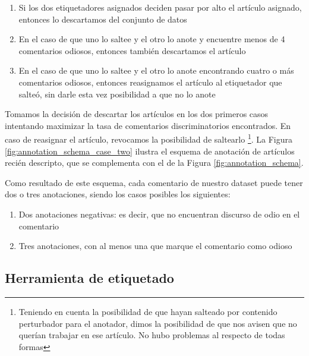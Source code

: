 \begin{enumerate}
    \item Si los dos etiquetadores asignados deciden pasar por alto el artículo asignado, entonces lo descartamos del conjunto de datos
    \item En el caso de que uno lo saltee y el otro lo anote y encuentre menos de 4 comentarios odiosos, entonces también descartamos el artículo
    \item En el caso de que uno lo saltee y el otro lo anote encontrando cuatro o más comentarios odiosos, entonces reasignamos el artículo al etiquetador que salteó, sin darle esta vez posibilidad a que no lo anote
\end{enumerate}

Tomamos la decisión de descartar los artículos en los dos primeros casos intentando maximizar la tasa de comentarios discriminatorios encontrados. En caso de reasignar el artículo, revocamos la posibilidad de saltearlo \footnote{Teniendo en cuenta la posibilidad de que hayan salteado por contenido perturbador para el anotador, dimos la posibilidad de que nos avisen que no querían trabajar en ese artículo. No hubo problemas al respecto de todas formas}. La Figura \ref{fig:annotation_schema_case_two} ilustra el esquema de anotación de artículos recién descripto, que se complementa con el de la Figura \ref{fig:annotation_schema}.





Como resultado de este esquema, cada comentario de nuestro dataset puede tener dos o tres anotaciones, siendo los casos posibles los siguientes:

\begin{enumerate}
    \item Dos anotaciones negativas: es decir, que no encuentran discurso de odio en el comentario
    \item Tres anotaciones, con al menos una que marque el comentario como odioso
\end{enumerate}


%
%
\subsection{Herramienta de etiquetado}


